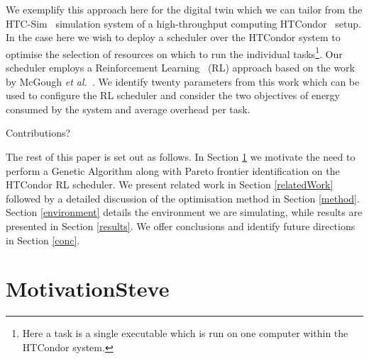 \documentclass[10pt, conference, compsocconf]{IEEEtran}
\begin{document}
We exemplify this approach here for the digital twin which we can tailor from the HTC-Sim~\cite{htc-sim} simulation system of a high-throughput computing HTCondor~\cite{htcondor} setup. In the case here we wish to deploy a scheduler over the HTCondor system to optimise the selection of resources on which to run the individual tasks\footnote{Here a task is a single executable which is run on one computer within the HTCondor system.}. Our scheduler employs a Reinforcement Learning~\cite{rl} (RL) approach based on the work by McGough \textit{et al.}~\cite{suscom}. We identify twenty parameters from this work which can be used to configure the RL scheduler and consider the two objectives of energy consumed by the system and average overhead per task.
	
{\color{red}Contributions?}

The rest of this paper is set out as follows. In Section \ref{motivation} we motivate the need to perform a Genetic Algorithm along with Pareto frontier identification on the HTCondor RL scheduler. We present related work in Section \ref{relatedWork} followed by a detailed discussion of the optimisation method in Section \ref{method}. Section \ref{environment} details the environment we are simulating, while results are presented in Section \ref{results}. We offer conclusions and identify future directions in Section \ref{conc}.	

	

\section{Motivation{\color{red}Steve}}
\label{motivation}
\end{document}
